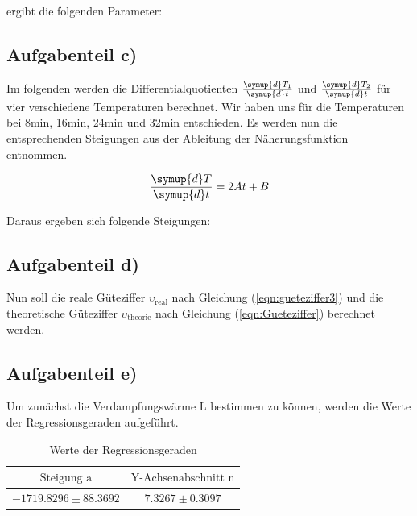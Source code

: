         ergibt die folgenden Parameter:

        


        \subsection{Aufgabenteil c)}

        Im folgenden werden die Differentialquotienten $\frac{\symup{d} T_1}{\symup{d} t}$ und $\frac{\symup{d} T_2}{\symup{d} t}$ für vier verschiedene Temperaturen berechnet.
        Wir haben uns für die Temperaturen bei 8min, 16min, 24min und 32min entschieden.
        Es werden nun die entsprechenden Steigungen aus der Ableitung der Näherungsfunktion entnommen.

        \begin{equation}
        \frac{\symup{d}T}{\symup{d}t} = 2At + B
        \end{equation}

        Daraus ergeben sich folgende Steigungen:
        
        


        \newpage
        \subsection{Aufgabenteil d)}

        Nun soll die reale Güteziffer $\upsilon_\text{real}$ nach Gleichung (\ref{eqn:gueteziffer3}) und die theoretische Güteziffer $\upsilon_\text{theorie}$ nach Gleichung (\ref{eqn:Gueteziffer}) berechnet werden.

        



        \subsection{Aufgabenteil e)}

        Um zunächst die Verdampfungswärme L bestimmen zu können, werden die Werte der Regressionsgeraden aufgeführt.

        \begin{table}
        \centering
        \label{massendurchsatz}
        \begin{tabular}{c c}
        \toprule
        $\text{Steigung a}$ & $\text{Y-Achsenabschnitt n}$ \\
        \midrule
        $-1719.8296 \pm 88.3692$ & $7.3267 \pm 0.3097$ \\
        \bottomrule
        \end{tabular}
        \caption{Werte der Regressionsgeraden}
        \end{table}

